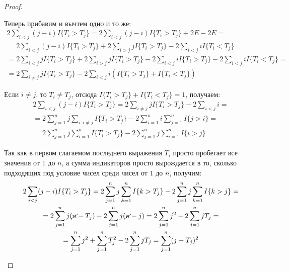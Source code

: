 \begin{proof}
\begin{enumerate}
        Теперь прибавим и вычтем одно и то же:
        \begin{multline*}
            2 \sum_{i < j} (j-i) I\{T_i > T_j\} = 2 \sum_{i < j} (j-i) I\{T_i > T_j\} + 2E - 2E =
            \\
            = 2 \sum_{i < j} (j-i) I\{T_i > T_j\} + 2 \sum_{i > j} j I\{T_i > T_j\} - 2 \sum_{i < j} i I\{T_i < T_j\} =
            \\
            = 2 \sum_{i < j} j I\{T_i > T_j\} + 2 \sum_{i > j} j I\{T_i > T_j\} - 2 \sum_{i < j} i I\{T_i > T_j\} - 2 \sum_{i < j} i I\{T_i < T_j\} =
            \\
            = 2 \sum_{i \neq j} j I\{T_i > T_j\} - 2 \sum_{i < j} i (I\{T_i > T_j\} + I\{T_i < T_j\})
        \end{multline*}

        Если $i \neq j$, то $T_i \neq T_j$, отсюда $I\{T_i > T_j\} + I\{T_i < T_j\} = 1$, получаем:
        \begin{multline*}
            2 \sum_{i < j} (j-i) I\{T_i > T_j\} = 2 \sum_{i \neq j} j I\{T_i > T_j\} - 2 \sum_{i < j} i =
            \\
            = 2 \sum_{j=1}^n j \sum_{i \colon i \neq j} I\{T_i > T_j\} - 2 \sum_{i=1}^n i \sum_{j = 1}^n I\{j > i\} =
            \\
            = 2 \sum_{j=1}^n j \sum_{i=1}^n I\{T_i > T_j\} - 2 \sum_{j=1}^n j \sum_{i=1}^n I\{i > j\}
        \end{multline*}

        Так как в первом слагаемом последнего выражения $T_i$ просто пробегает все значения от $1$ до $n$, а сумма индикаторов просто вырождается в то, сколько подходящих под условие чисел среди чисел от $1$ до $n$, получим:
        \begin{multline*}
            2 \sum_{i < j} (j-i) I\{T_i > T_j\} = 2 \sum_{j=1}^n j \sum_{k=1}^n I\{k > T_j\} - 2 \sum_{j=1}^n j \sum_{k=1}^n I\{k > j\} =
            \\
            = 2 \sum_{j=1}^n j (\cancel{n} - T_j) - 2 \sum_{j=1}^n j (\cancel{n} - j) = 2 \sum_{j=1}^n j^2 - 2 \sum_{j=1}^n j T_j =
            \\
            = \sum_{j=1}^n j^2 + \sum_{j=1}^n T_j^2 - 2 \sum_{j=1}^n j T_j = \sum_{j=1}^n (j-T_j)^2
        \end{multline*}        
    \end{enumerate}
\end{proof}

